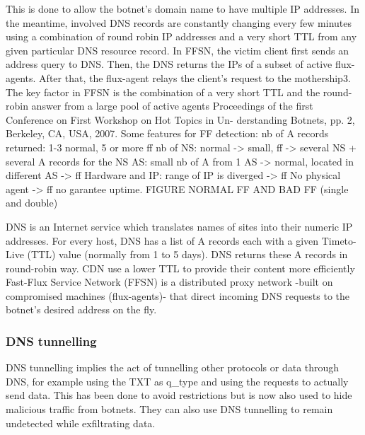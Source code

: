 This is done to allow the botnet’s domain name to have multiple IP addresses. In the meantime,
involved DNS records are constantly changing every few minutes using a combination of round robin
IP addresses and a very short TTL from any given particular DNS resource record.
In FFSN, the victim client first sends an address query to DNS. Then, the DNS returns the IPs of a
subset of active flux-agents. After that, the flux-agent relays the client’s request to the mothership3.
The key factor in FFSN is the combination of a very short TTL and the round-robin answer from a
large pool of active agents
Proceedings of the first Conference on First Workshop on Hot Topics in Un- derstanding Botnets, pp.
2, Berkeley, CA, USA, 2007.
Some features for FF detection: nb of A records returned: 1-3 normal, 5 or more ff nb of NS: normal
-> small, ff -> several NS + several A records for the NS AS: small nb of A from 1 AS -> normal,
located in different AS -> ff Hardware and IP: range of IP is diverged -> ff No physical agent -> ff no
garantee uptime.
FIGURE NORMAL FF AND BAD FF (single and double)

DNS is an Internet service which translates names of sites into their numeric IP addresses. For
every host, DNS has a list of A records each with a given Timeto- Live (TTL) value (normally from 1
to 5 days). DNS returns these A records in round-robin way.
CDN use a lower TTL to provide their content more efficiently
Fast-Flux Service Network (FFSN) is a distributed proxy network -built on compromised machines
(flux-agents)- that direct incoming DNS requests to the botnet’s desired address on the fly.



\subsubsection{DNS tunnelling}
DNS tunnelling implies the act of tunnelling other protocols or data through DNS, for example using the TXT as q\_type and using the requests to actually send data. This has been done to avoid restrictions but is now also used to hide malicious traffic from botnets. They can also use DNS tunnelling to remain undetected while exfiltrating data. \cite{Botnet1}

